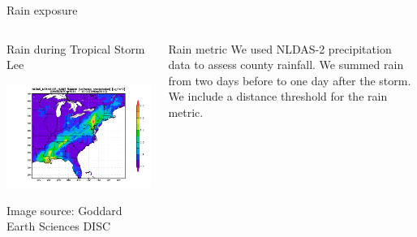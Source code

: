\documentclass[ignorenonframetext,]{beamer}
\begin{document}
\begin{frame}{Rain exposure}

\begin{columns}
\begin{column}{0.7\textwidth}  
    \vspace{-0.25cm}
    \begin{center}
    Rain during Tropical Storm Lee
    \end{center}
    \begin{center}
     \includegraphics[width=\textwidth]{nldas2_ts_lee.png}
     \end{center}
     \begin{center}
         \vspace{-0.4cm}
     \scriptsize{Image source: Goddard Earth Sciences DISC}
     \end{center}
\end{column}
\begin{column}{0.3\textwidth}
\footnotesize
\begin{block}{Rain metric}
We used NLDAS-2 precipitation data to assess county rainfall. We summed rain from two days before to one day after the storm. We include a distance threshold for the rain metric.
\end{block}
\end{column}
\end{columns}

\end{frame}
\end{document}
